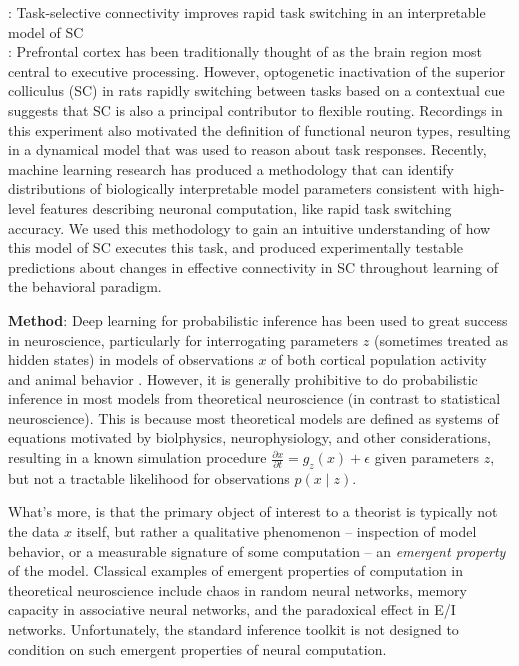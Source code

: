 \documentclass[12pt]{article}
\begin{document}
: Task-selective connectivity improves rapid task switching in an interpretable model of SC \\
: Prefrontal cortex has been traditionally thought of as the brain region most central to executive processing.  However, optogenetic inactivation of the superior colliculus (SC) in rats rapidly switching between tasks based on a contextual cue suggests that SC is also a principal contributor to flexible routing.  Recordings in this experiment also motivated the definition of functional neuron types, resulting in a dynamical model that was used to reason about task responses.  Recently, machine learning research has produced a methodology that can  identify distributions of biologically interpretable model parameters consistent with high-level features describing neuronal computation, like rapid task switching accuracy.  We used this methodology to gain an intuitive understanding of how this model of SC executes this task, and produced experimentally testable predictions about changes in effective connectivity in SC throughout learning of the behavioral paradigm. 

\vspace{-4pt}
\noindent\makebox[\linewidth]{\rule{\columnwidth}{0.4pt}}
 
\noindent \textbf{Method}: Deep learning for probabilistic inference has been used to great success in neuroscience, particularly for interrogating parameters $z$ (sometimes treated as hidden states) in models of observations $x$ of both cortical population activity and animal behavior \cite{paninski2018neural}.  However, it is generally prohibitive to do probabilistic inference in most models from theoretical neuroscience (in contrast to statistical neuroscience). This is because most theoretical models are defined as systems of equations motivated by biolphysics, neurophysiology, and other considerations, resulting in a known simulation procedure $\frac{\partial x}{\partial t} = g_z(x) + \epsilon$ given parameters $z$, but not a tractable likelihood for observations $p(x \mid z)$.

What's more, is that the primary object of interest to a theorist is typically not the data $x$ itself, but rather a qualitative phenomenon -- inspection of model behavior, or a measurable signature of some computation -- an \emph{emergent property} of the model.  
Classical examples of emergent properties of computation in theoretical neuroscience include chaos in random neural networks, memory capacity in associative neural networks, and the paradoxical effect in E/I networks.
Unfortunately, the standard inference toolkit is not designed to condition on such emergent properties of neural computation.
\end{document}
